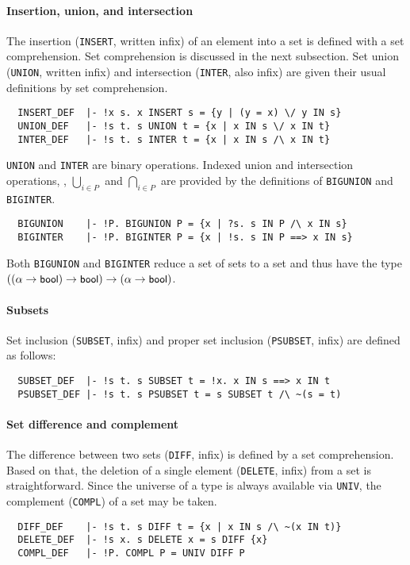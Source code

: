 \paragraph{Insertion, union, and intersection}

The insertion ({\small\verb+INSERT+}, written infix) of an element
into a set is defined with a set comprehension. Set comprehension is
discussed in the next subsection. Set union ({\small\verb+UNION+},
written infix) and intersection ({\small\verb+INTER+}, also infix)
are given their usual definitions by set comprehension.
%
{\small
\begin{verbatim}
  INSERT_DEF  |- !x s. x INSERT s = {y | (y = x) \/ y IN s}
  UNION_DEF   |- !s t. s UNION t = {x | x IN s \/ x IN t}
  INTER_DEF   |- !s t. s INTER t = {x | x IN s /\ x IN t}
\end{verbatim}}
%
{\small\verb+UNION+} and {\small\verb+INTER+} are binary
operations. Indexed union and intersection operations, \ie,
$\bigcup_{i \in P}$ and $\bigcap_{i \in P}$ are provided by the
definitions of  {\small\verb+BIGUNION+} and {\small\verb+BIGINTER+}.
{\small
\begin{verbatim}
  BIGUNION    |- !P. BIGUNION P = {x | ?s. s IN P /\ x IN s}
  BIGINTER    |- !P. BIGINTER P = {x | !s. s IN P ==> x IN s}
\end{verbatim}}
%
Both {\small\verb+BIGUNION+} and {\small\verb+BIGINTER+} reduce
a set of sets to a set and thus have the type
$((\alpha\to\mbox{\small{\textbf{\sf{bool}}}})\to\mbox{\small{\textbf{\sf{bool}}}})\to (\alpha\to\mbox{\small{\textbf{\sf{bool}}}})$.

\paragraph{Subsets}

Set inclusion ({\small\verb+SUBSET+}, infix) and proper set inclusion
({\small\verb+PSUBSET+}, infix) are defined as follows:
%
{\small
\begin{verbatim}
  SUBSET_DEF  |- !s t. s SUBSET t = !x. x IN s ==> x IN t
  PSUBSET_DEF |- !s t. s PSUBSET t = s SUBSET t /\ ~(s = t)
\end{verbatim}}

\paragraph{Set difference and complement}

The difference between two sets ({\small\verb+DIFF+}, infix) is
defined by a set comprehension. Based on that, the deletion of a
single element ({\small\verb+DELETE+}, infix) from a set is
straightforward. Since the universe of a type is always available via
{\small\verb+UNIV+}, the complement ({\small\verb+COMPL+}) of a set
may be taken.
{\small
\begin{verbatim}
  DIFF_DEF    |- !s t. s DIFF t = {x | x IN s /\ ~(x IN t)}
  DELETE_DEF  |- !s x. s DELETE x = s DIFF {x}
  COMPL_DEF   |- !P. COMPL P = UNIV DIFF P
\end{verbatim}}
%
